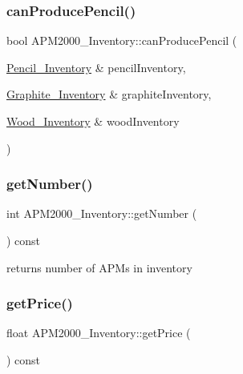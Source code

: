 \subsubsection{\texorpdfstring{can\+Produce\+Pencil()}{canProducePencil()}}
{\footnotesize\ttfamily bool A\+P\+M2000\+\_\+\+Inventory\+::can\+Produce\+Pencil (\begin{DoxyParamCaption}\item[{\hyperlink{classPencil__Inventory}{Pencil\+\_\+\+Inventory} \&}]{pencil\+Inventory,  }\item[{\hyperlink{classGraphite__Inventory}{Graphite\+\_\+\+Inventory} \&}]{graphite\+Inventory,  }\item[{\hyperlink{classWood__Inventory}{Wood\+\_\+\+Inventory} \&}]{wood\+Inventory }\end{DoxyParamCaption})}

\mbox{\label{classAPM2000__Inventory_a9a9bacffea28885b6c268d9a3bcab401}} 
\subsubsection{\texorpdfstring{get\+Number()}{getNumber()}}
{\footnotesize\ttfamily int A\+P\+M2000\+\_\+\+Inventory\+::get\+Number (\begin{DoxyParamCaption}{ }\end{DoxyParamCaption}) const}



returns number of A\+P\+Ms in inventory 

\mbox{\label{classAPM2000__Inventory_a65388780b7aa2066cfaf86c85d501765}} 
\subsubsection{\texorpdfstring{get\+Price()}{getPrice()}}
{\footnotesize\ttfamily float A\+P\+M2000\+\_\+\+Inventory\+::get\+Price (\begin{DoxyParamCaption}{ }\end{DoxyParamCaption}) const}



